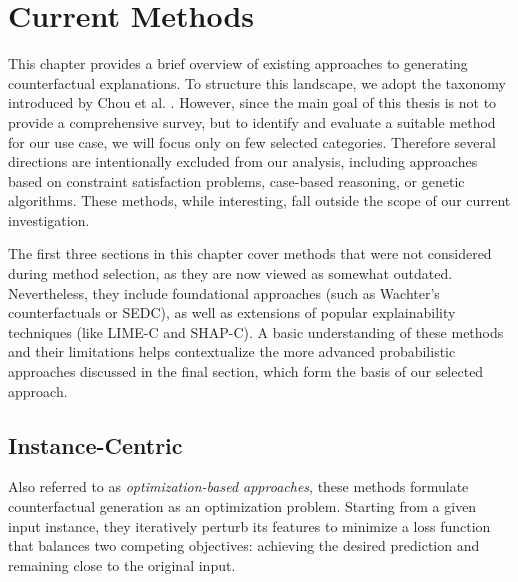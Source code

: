 \chapter{Current Methods}

This chapter provides a brief overview of existing approaches to generating counterfactual explanations.
To structure this landscape, we adopt the taxonomy introduced by Chou et al. \cite{chou2022counterfactuals}.
However, since the main goal of this thesis is not to provide a comprehensive survey,
but to identify and evaluate a suitable method for our use case, we will focus only on few selected categories.
Therefore several directions are intentionally excluded from our analysis,
including approaches based on constraint satisfaction problems, case-based reasoning, or genetic algorithms.
These methods, while interesting, fall outside the scope of our current investigation.

The first three sections in this chapter cover methods that were not considered during method selection,
as they are now viewed as somewhat outdated. Nevertheless, they include foundational approaches (such as Wachter's counterfactuals or SEDC),
as well as extensions of popular explainability techniques (like LIME-C and SHAP-C).
A basic understanding of these methods and their limitations helps
contextualize the more advanced probabilistic approaches discussed in the final section,
which form the basis of our selected approach.

\section{Instance-Centric}

Also referred to as \emph{optimization-based approaches},
these methods formulate counterfactual generation as an optimization problem.
Starting from a given input instance, they iteratively perturb its features to minimize a loss function
that balances two competing objectives: achieving the desired prediction and remaining close to the original input.

